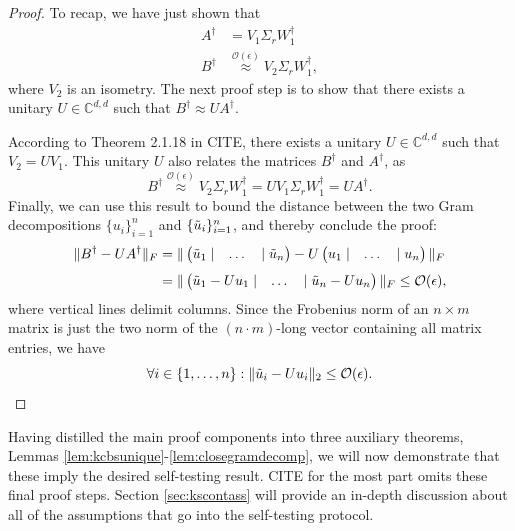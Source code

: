 \begin{proof}
To recap, we have just shown that
\begin{align*}
A^{\dag} & =V_1\Sigma_r W_1^{\dag} \\[0.3em]
B^{\dag} & \stackrel{\mathcal{O}(\epsilon)}{\approx} V_2\Sigma_r W_1^{\dag},
\end{align*}
where $V_2$ is an isometry. The next proof step is to show that there exists a unitary $U\in\mathbb{C}^{d,d}$ such that $B^{\dag}\approx U A^{\dag}$.

According to Theorem 2.1.18 in CITE, there exists a unitary $U\in\mathbb{C}^{d,d}$ such that $V_2=UV_1$. This unitary $U$ also relates the matrices $B^{\dag}$ and $A^{\dag}$, as
\begin{equation*}
B^{\dag}\stackrel{\mathcal{O}(\epsilon)}{\approx}V_2\Sigma_r W_1^{\dag}= UV_1\Sigma_r W_1^{\dag}=UA^{\dag}.
\end{equation*} 
Finally, we can use this result to bound the distance between the two Gram decompositions $\{u_i\}_{i=1}^n$ and $\{\Tilde{u}_i\}_{i=1}^n$, and thereby conclude the proof:
\begin{align*}
\|B^{\dag}-UA^{\dag}\|_F&=\|
\begin{pmatrix}
\Tilde{u}_1 \;| & \dots & |\; \Tilde{u}_n
\end{pmatrix}-U
\begin{pmatrix}
u_1 \;| & \dots &  | \; u_n
\end{pmatrix} \|_F \\[0.3em]
& = \|
\begin{pmatrix}
\Tilde{u}_1-U u_1\; | &\dots& |\;\Tilde{u}_n-U u_n
\end{pmatrix}
\|_F\leq\mathcal{O}(\epsilon),
\end{align*}
where vertical lines delimit columns.
Since the Frobenius norm of an $n\times m$ matrix is just the two norm of the $(n\cdot m)$-long vector containing all matrix entries, we have
\begin{equation*}
\forall i\in\{1,\dots,n\}: \|\Tilde{u}_i-U u_i\|_2 \leq \mathcal{O}(\epsilon).
\end{equation*}
\end{proof}

Having distilled the main proof components into three auxiliary theorems, Lemmas \ref{lem:kcbsunique}-\ref{lem:closegramdecomp}, we will now demonstrate that these imply the desired self-testing result. CITE for the most part omits these final proof steps. Section \ref{sec:kscontass} will provide an in-depth discussion about all of the assumptions that go into the self-testing protocol.

